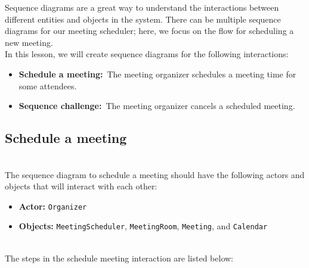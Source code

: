 

Sequence diagrams are a great way to understand the interactions between different entities and objects in the system. There can be multiple sequence diagrams for our meeting scheduler; here, we focus on the flow for scheduling a new meeting.
\\
In this lesson, we will create sequence diagrams for the following interactions:

\begin{itemize}
\item
\protect{}\label{yKxI54WXdqEVVEGwrxRhD}
\textbf{Schedule a meeting:}~The meeting organizer schedules a meeting time for some attendees.
\item
\protect{}\label{O1Moad9ZhBSh6UBaz0oDG}
\textbf{Sequence challenge:}~The meeting organizer cancels a scheduled meeting.
\end{itemize}

\subsection{Schedule a meeting}\label{RAjpkXXrc0ZzS0bqgtYrj}
\\
The sequence diagram to schedule a meeting should have the following actors and objects that will interact with each other:

\begin{itemize}
\item
\protect{}\label{N3XI3umAtJzz_PPxEicOv}
\textbf{Actor:} \texttt{Organizer}
\item
\protect{}\label{-dtDYbYO4tru1V1OMInsz}
\textbf{Objects:} \texttt{MeetingScheduler}, \texttt{MeetingRoom}, \texttt{Meeting}, and \texttt{Calendar}
\end{itemize}
\\
The steps in the schedule meeting interaction are listed below:

